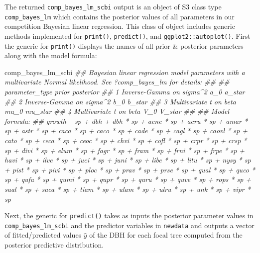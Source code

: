 \documentclass[12pt]{article}
\newenvironment{Shaded}{\begin{snugshade}}{\end{snugshade}}
\newcommand{\CommentTok}[1]{\textcolor[rgb]{0.56,0.35,0.01}{\textit{#1}}}
\newcommand{\DataTypeTok}[1]{\textcolor[rgb]{0.13,0.29,0.53}{#1}}
\newcommand{\KeywordTok}[1]{\textcolor[rgb]{0.13,0.29,0.53}{\textbf{#1}}}
\newcommand{\NormalTok}[1]{#1}
\newcommand{\OperatorTok}[1]{\textcolor[rgb]{0.81,0.36,0.00}{\textbf{#1}}}
\newcommand{\OtherTok}[1]{\textcolor[rgb]{0.56,0.35,0.01}{#1}}
\newcommand{\StringTok}[1]{\textcolor[rgb]{0.31,0.60,0.02}{#1}}
\begin{document}
\begin{Shaded}
\end{Shaded}

The returned \texttt{comp\_bayes\_lm\_scbi} output is an object of S3
class type \texttt{comp\_bayes\_lm} which contains the posterior values
of all parameters in our competition Bayesian linear regression. This
class of object includes generic methods implemented for
\texttt{print()}, \texttt{predict()}, and \texttt{ggplot2::autoplot()}.
First the generic for \texttt{print()} displays the names of all prior
\& posterior parameters along with the model formula:

\begin{Shaded}
\begin{Highlighting}[]
\NormalTok{comp_bayes_lm_scbi}
\CommentTok{## Bayesian linear regression model parameters with a multivariate Normal likelihood. See ?comp_bayes_lm for details:}
\CommentTok{## }
\CommentTok{##   parameter_type           prior posterior}
\CommentTok{## 1 Inverse-Gamma on sigma^2 a_0   a_star   }
\CommentTok{## 2 Inverse-Gamma on sigma^2 b_0   b_star   }
\CommentTok{## 3 Multivariate t on beta   mu_0  mu_star  }
\CommentTok{## 4 Multivariate t on beta   V_0   V_star   }
\CommentTok{## }
\CommentTok{## Model formula:}
\CommentTok{## growth ~ sp + dbh + dbh * sp + acne * sp + acru * sp + amar * sp + astr * sp + caca * sp + caco * sp + cade * sp + cagl * sp + caovl * sp + cato * sp + ceca * sp + ceoc * sp + chvi * sp + cofl * sp + crpr * sp + crsp * sp + divi * sp + elum * sp + fagr * sp + fram * sp + frni * sp + frpe * sp + havi * sp + ilve * sp + juci * sp + juni * sp + libe * sp + litu * sp + nysy * sp + pist * sp + pivi * sp + ploc * sp + prav * sp + prse * sp + qual * sp + quco * sp + qufa * sp + qumi * sp + qupr * sp + quru * sp + quve * sp + rops * sp + saal * sp + saca * sp + tiam * sp + ulam * sp + ulru * sp + unk * sp + vipr * sp}
\end{Highlighting}
\end{Shaded}

Next, the generic for \texttt{predict()} takes as inputs the posterior
parameter values in \texttt{comp\_bayes\_lm\_scbi} and the predictor
variables in \texttt{newdata} and outputs a vector of fitted/predicted
values \(\widehat{y}\) of the DBH for each focal tree computed from the
posterior predictive distribution.
\end{document}
